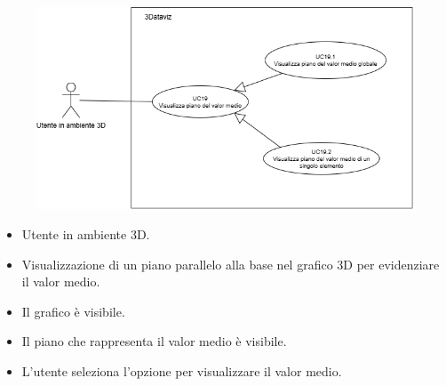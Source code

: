 \begin{figure}[H]\centering
    \includegraphics[scale=0.7]{template/images/UC19.png}
    \caption{}
\end{figure}
\UCdsc
{ %
    \begin{itemize}
        \item Utente in ambiente 3D.
    \end{itemize}
}
{ %
    \begin{itemize}
        \item Visualizzazione di un piano parallelo alla base nel grafico 3D per evidenziare il valor medio.
    \end{itemize}
}
{ %
    \begin{itemize}
        \item Il grafico è visibile.
    \end{itemize}
}
{ %
    \begin{itemize}
        \item Il piano che rappresenta il valor medio è visibile.
    \end{itemize}
}
{ %
    \begin{itemize}
        \item L'utente seleziona l'opzione per visualizzare il valor medio.
    \end{itemize}
}


